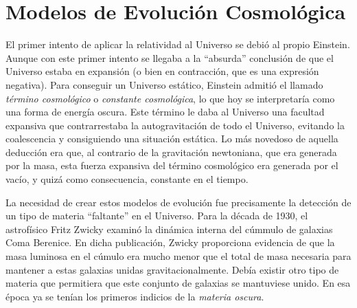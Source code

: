 \documentclass[a4paper,openright,12pt]{book}
\begin{document}
\section{Modelos de Evolución Cosmológica}
El primer intento de aplicar la relatividad al Universo se debió al propio Einstein. Aunque con este primer intento se llegaba a la ``absurda'' conclusión de que el Universo estaba en expansión (o bien en contracción, que es una expresión negativa). Para conseguir un Universo estático, Einstein admitió el llamado \textit{término cosmológico} o \textit{constante cosmológica}, lo que hoy se interpretaría como una forma de energía oscura. Este término le daba al Universo una facultad expansiva que contrarrestaba la autogravitación de todo el Universo, evitando la coalescencia y consiguiendo una situación estática. Lo más novedoso de aquella deducción era que, al contrario de la gravitación newtoniana, que era generada por la masa, esta fuerza expansiva del término cosmológico era generada por el vacío, y quizá como consecuencia, constante en el tiempo.

La necesidad de crear estos modelos de evolución fue precisamente la detección de un tipo de materia ``faltante'' en el Universo. Para la década de 1930, el astrofísico Fritz Zwicky \cite{1.1.1} examinó la dinámica interna del cúmmulo de galaxias Coma Berenice. En dicha publicación, Zwicky proporciona evidencia de que la masa luminosa en el cúmulo era mucho menor que el total de masa  necesaria para mantener a estas galaxias unidas gravitacionalmente. Debía existir otro tipo de materia que permitiera que este conjunto de galaxias se mantuviese unido. En esa época ya se tenían los primeros indicios de la \textit{materia oscura}.
\end{document}
